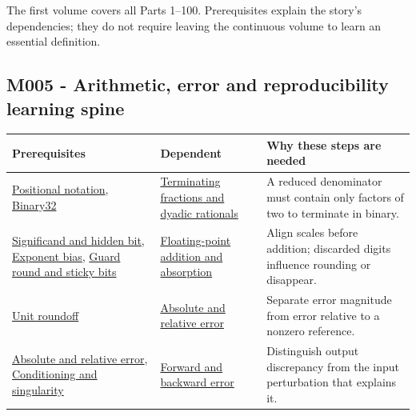The first volume covers all Parts 1--100. Prerequisites explain the story's dependencies; they do not require leaving the continuous volume to learn an essential definition.

\subsection{M005 - Arithmetic, error and reproducibility learning spine}\label{appendix-4ad47bdd269a-m005---arithmetic-error-and-reproducibility-learning-spine}

{\def\LTcaptype{none} %
\begin{longtable}[]{@{}
  >{\raggedright\arraybackslash}p{}
  >{\raggedright\arraybackslash}p{}
  >{\raggedright\arraybackslash}p{}@{}}
\toprule\noalign{}
\begin{minipage}[b]{\linewidth}\raggedright
Prerequisites
\end{minipage} & \begin{minipage}[b]{\linewidth}\raggedright
Dependent
\end{minipage} & \begin{minipage}[b]{\linewidth}\raggedright
Why these steps are needed
\end{minipage} \\
\midrule\noalign{}
\endhead
\bottomrule\noalign{}
\endlastfoot
\hyperref[appendix-83c3f28f7bda]{Positional notation}, \hyperref[appendix-5057f9ad327f]{Binary32} & \hyperref[appendix-2a2f1b74bdd3]{Terminating fractions and dyadic rationals} & A reduced denominator must contain only factors of two to terminate in binary. \\
\hyperref[appendix-a24fd710cf67]{Significand and hidden bit}, \hyperref[appendix-2fae058c82e1]{Exponent bias}, \hyperref[appendix-b572b631069b]{Guard round and sticky bits} & \hyperref[appendix-a1b1b4580dfd]{Floating-point addition and absorption} & Align scales before addition; discarded digits influence rounding or disappear. \\
\hyperref[appendix-bc44f7b42f42]{Unit roundoff} & \hyperref[appendix-3ae74e89b4e6]{Absolute and relative error} & Separate error magnitude from error relative to a nonzero reference. \\
\hyperref[appendix-3ae74e89b4e6]{Absolute and relative error}, \hyperref[appendix-8f6a01f284a7]{Conditioning and singularity} & \hyperref[appendix-a7fbaf6d1b1c]{Forward and backward error} & Distinguish output discrepancy from the input perturbation that explains it. \\

\end{longtable}}
